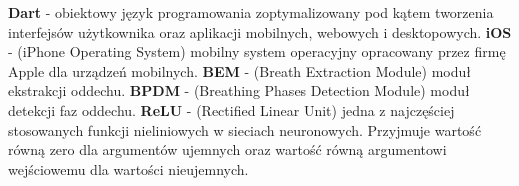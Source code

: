 \textbf{Dart} - obiektowy język programowania zoptymalizowany pod kątem tworzenia interfejsów użytkownika oraz aplikacji mobilnych, webowych i desktopowych. \newline
\textbf{iOS} - (iPhone Operating System) mobilny system operacyjny opracowany przez firmę Apple dla urządzeń mobilnych. \newline
\textbf{BEM} - (Breath Extraction Module) moduł ekstrakcji oddechu. \newline
\textbf{BPDM} - (Breathing Phases Detection Module) moduł detekcji faz oddechu. \newline
\textbf{ReLU} - (Rectified Linear Unit) jedna z najczęściej stosowanych funkcji nieliniowych w sieciach neuronowych. Przyjmuje wartość równą zero dla argumentów ujemnych oraz wartość równą argumentowi wejściowemu dla wartości nieujemnych. \newline
